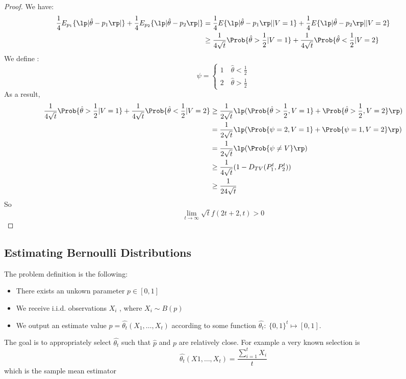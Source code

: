 \begin{proof}
We have:
\begin{align*}
\frac{1}{4} E_{p_1}\{\lp|\hat{\theta} - p_1\rp|\} + \frac{1}{4} E_{p_2}\{\lp|\hat{\theta} - p_2\rp|\} 
&= \frac{1}{4} E\{\lp|\hat{\theta} - p_1\rp|| V = 1\} + \frac{1}{4} E\{\lp|\hat{\theta} - p_2\rp|| V = 2\}\\
&\geq \frac{1}{4\sqrt{t}}\Prob{\hat{\theta} > \frac{1}{2}|V = 1} + \frac{1}{4\sqrt{t}}\Prob{\hat{\theta} < \frac{1}{2}|V = 2} 
\end{align*}
We define :
$$
\psi = 
\begin{cases}
1 \quad \hat{\theta} < \frac{1}{2}\\
2 \quad \hat{\theta} > \frac{1}{2}
\end{cases}
$$
As a result, 
\begin{align*}
\frac{1}{4\sqrt{t}}\Prob{\hat{\theta} > \frac{1}{2}|V = 1} + \frac{1}{4\sqrt{t}}\Prob{\hat{\theta} < \frac{1}{2}|V = 2} 
&\geq \frac{1}{2\sqrt{t}}\lp(\Prob{\hat{\theta} > \frac{1}{2},V = 1} + \Prob{\hat{\theta} > \frac{1}{2},V = 2}\rp)\\
&= \frac{1}{2\sqrt{t}}\lp(\Prob{\psi = 2,V = 1} + \Prob{\psi = 1,V = 2}\rp) \\
&= \frac{1}{2\sqrt{t}}\lp(\Prob{\psi \neq V}\rp)\\
&\geq \frac{1}{4\sqrt{t}}(1 - D_{TV}(P_1^t,P_2^t))\\
&\geq \frac{1}{24\sqrt{t}}
\end{align*}
So 
$$
\lim_{t \to \infty} \sqrt{t} f(2t+2,t) > 0
$$




\end{proof}
\subsection{Estimating Bernoulli Distributions}
The problem definition is the following:
\begin{itemize}
\item There exists an unkown parameter $p \in [0,1]$
\item We receive i.i.d. observations $X_i$ , where $X_i\sim B(p)$ 
\item We output an estimate value $\hat{p}=\hat{\theta_t}(X_1,\ldots,X_t)$ according to some function $\hat{\theta_t}:~ \{0,1\}^t\mapsto [0,1]$.
 \end{itemize}
The goal is to appropriately select $\hat{\theta_t}$ such that $\hat{p}$ and $p$ are relatively close. For example a very known selection is $$\hat{\theta_t}(X1,\ldots,X_t)= \frac{\sum_{i=1}^t X_i}{t}$$ which is the sample mean estimator

